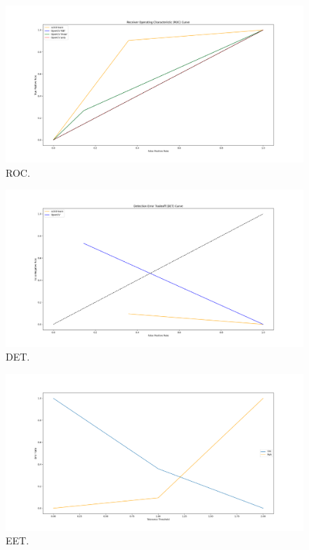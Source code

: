 \begin{figure}[h!t]
    \centering
    \includegraphics[scale=0.25]{images/roc.png}
    \caption{ROC.}
    \label{fig:roc}
\end{figure}

\begin{figure}[h!t]
    \centering
    \includegraphics[scale=0.25]{images/det.png}
    \caption{DET.}
    \label{fig:det}
\end{figure}

\begin{figure}[h!t]
    \centering
    \includegraphics[scale=0.25]{images/eet.png}
    \caption{EET.}
    \label{fig:eet}
\end{figure}
